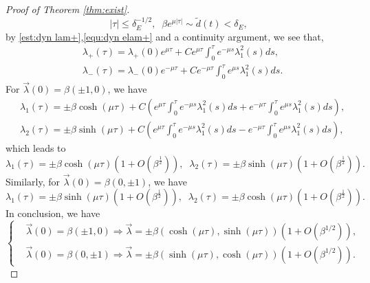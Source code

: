\documentclass[reqno, 11pt]{amsart}
\numberwithin{equation}{section}
\theoremstyle{plain}
\theoremstyle{definition}
\numberwithin{equation}{section}
\numberwithin{theorem}{section}
\numberwithin{equation}{section}
\numberwithin{equation}{section}
\numberwithin{theorem}{section}
\begin{document}
\begin{proof}[Proof of Theorem \ref{thm:exist}]
\begin{equation}
		|\tau|\leq \delta_{E}^{-1/2},\;\; \beta e^{\mu|\tau|}\sim \widetilde{d}(t)<\delta_{E},
		\end{equation}
		by \eqref{est:dyn lam+},\eqref{equ:dyn elam+} and a continuity argument, we see that,
		\begin{align*}
		&\lambda_{+}(\tau)=\lambda_{+}(0)e^{\mu\tau}+Ce^{\mu\tau}\int_{0}^{\tau}e^{-\mu s}\lambda_{1}^2(s)ds,\\&\lambda_{-}(\tau)=\lambda_{-}(0)e^{-\mu\tau}+Ce^{-\mu\tau}\int_{0}^{\tau}e^{\mu s}\lambda_{1}^2(s)ds.
		\end{align*}
		For $\vec{\lambda}(0)=\beta(\pm1,0)$, we have
		\begin{align*}
		&\lambda_{1}(\tau)=\pm\beta \cosh(\mu\tau)+C\left( e^{\mu\tau}\int_{0}^{\tau}e^{-\mu s}\lambda_{1}^2(s)ds+e^{-\mu\tau}\int_{0}^{\tau}e^{\mu s}\lambda_{1}^2(s)ds \right),\\&\lambda_{2}(\tau)=\pm\beta \sinh(\mu\tau)+C\left( e^{\mu\tau}\int_{0}^{\tau}e^{-\mu s}\lambda_{1}^2(s)ds-e^{-\mu\tau}\int_{0}^{\tau}e^{\mu s}\lambda_{1}^2(s)ds \right),
		\end{align*}
		which leads to 
		\begin{equation*}
		\lambda_{1}(\tau)=\pm\beta \cosh(\mu\tau)\left( 1+O(\beta^\frac12) \right),\;\;\lambda_{2}(\tau)=\pm\beta \sinh(\mu\tau)\left( 1+O(\beta^\frac12) \right).
		\end{equation*}
		Similarly, for $\vec{\lambda}(0)=\beta(0,\pm1)$, we have
		\begin{equation*}
		\lambda_{1}(\tau)=\pm\beta \sinh(\mu\tau)\left( 1+O(\beta^\frac12) \right),\;\;\lambda_{2}(\tau)=\pm\beta \cosh(\mu\tau)\left( 1+O(\beta^\frac12) \right).
		\end{equation*}
		In conclusion, we have
		\begin{equation}\label{hyperbolic}
		\left\{\begin{aligned}
		&\vec{\lambda}(0)=\beta(\pm1,0) \Longrightarrow \vec{\lambda}=\pm \beta\left(\cosh(\mu\tau),\sinh(\mu\tau) \right)\left(1+O(\beta^{1/2}) \right),\\
		&\vec{\lambda}(0)=\beta(0,\pm1) \Longrightarrow \vec{\lambda}=\pm \beta\left(\sinh(\mu\tau),\cosh(\mu\tau) \right)\left(1+O(\beta^{1/2}) \right). \end{aligned}\right.
		\end{equation}
		

\end{proof}
\end{document}
